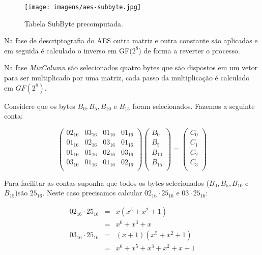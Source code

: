 \begin{figure}[!htp]
  \centering
    \texttt{[image: imagens/aes-subbyte.jpg]}
  \caption{Tabela SubByte precomputada.}
  \label{fig:subbyte}
\end{figure}

Na fase de descriptografia do AES outra matriz e outra constante são aplicadas e em seguida é calculado o inverso em GF($2^8$) de forma a reverter o processo.

Na fase {\em MixColumn} são selecionados quatro bytes que são dispostos em um vetor para ser multiplicado por uma matriz, cada passo da multiplicação é calculado em $GF(2^8)$.


\begin{example}
  Considere que os bytes $B_0, B_5, B_{10}$ e $B_{15}$ foram selecionados.
  Fazemos a seguinte conta:

\begin{displaymath}
\left(\begin{array}{cccc}
02_{16} & 03_{16} & 01_{16} & 01_{16} \\
01_{16} & 02_{16} & 03_{16} & 01_{16} \\
01_{16} & 01_{16} & 02_{16} & 03_{16} \\
03_{16} & 01_{16} & 01_{16} & 02_{16} \\
\end{array} \right) 
\left( \begin{array}{c}
B_0\\ B_5\\ B_{10}\\ B_{15}\\\end{array} \right)
=
\left( \begin{array}{c}
C_0\\ C_1\\ C_2\\ C_3\\\end{array} \right)
\end{displaymath}  

Para facilitar as contas suponha que todos os bytes selecionados ($B_0, B_5, B_{10}$ e $B_{15}$)são $25_{16}$.
Neste caso precisamos calcular $02_{16} \cdot 25_{16}$ e $03 \cdot 25_{16}$:


\begin{eqnarray*}
  02_{16} \cdot 25_{16} & = & x(x^5 + x^2 + 1)\\
                      & = & x^6 + x^3 + x\\
  03_{16} \cdot 25_{16} & = & (x + 1)(x^5 + x^2 + 1)\\ 
                      & = & x^6 + x^5 + x^3 + x^2 + x + 1\\ 
\end{eqnarray*}


\end{example}

